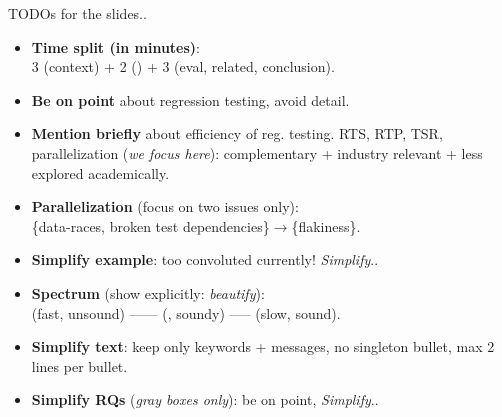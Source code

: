 \documentclass{beamer}
\begin{document}
\begin{frame}{TODOs for the slides..}
	\begin{itemize}
		\item[]{\textbf{Time split (in minutes)}:\\3 (context) + 2 (\tname{}) + 3 (eval, related, conclusion).}
		\vfill
		\item{\textbf{Be on point} about regression testing, avoid detail.}
		\item{\textbf{Mention briefly} about efficiency of reg. testing. RTS, RTP, TSR, parallelization (\textit{we focus here}): complementary + industry relevant + less explored academically.}
		\item{\textbf{Parallelization} (focus on two issues only):\\\{data-races, broken test dependencies\}$\rightarrow$\{flakiness\}.}
		\item{\textbf{Simplify example}: too convoluted currently! \textit{Simplify}..}
		\item{\textbf{Spectrum} (show explicitly: \textit{beautify}):\\(fast, unsound) ------ (\tname{}, soundy) ----- (slow, sound).}
		\item{\textbf{Simplify text}: keep only keywords + messages, no singleton bullet, max 2 lines per bullet.}
		\item{\textbf{Simplify RQs} (\textit{gray boxes only}): be on point, \textit{Simplify}..}
	\end{itemize}
\end{frame}

\backupend
\end{document}
